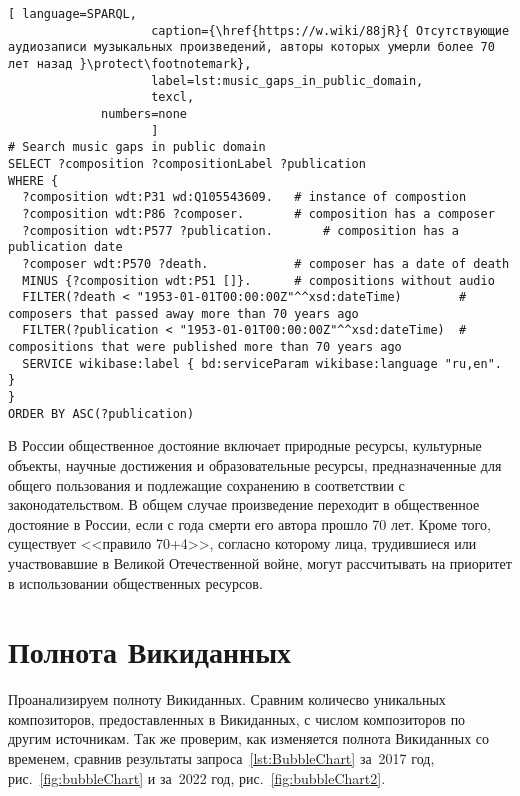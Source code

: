 \begin{lstlisting}[ language=SPARQL,
                    caption={\href{https://w.wiki/88jR}{ Отсутствующие аудиозаписи музыкальных произведений, авторы которых умерли более 70 лет назад }\protect\footnotemark},
                    label=lst:music_gaps_in_public_domain,
                    texcl,
	         numbers=none
                    ]
# Search music gaps in public domain
SELECT ?composition ?compositionLabel ?publication
WHERE {
  ?composition wdt:P31 wd:Q105543609.	# instance of compostion
  ?composition wdt:P86 ?composer.		# composition has a composer
  ?composition wdt:P577 ?publication.		# composition has a publication date
  ?composer wdt:P570 ?death.			# composer has a date of death
  MINUS {?composition wdt:P51 []}.		# compositions without audio 
  FILTER(?death < "1953-01-01T00:00:00Z"^^xsd:dateTime)        # composers that passed away more than 70 years ago
  FILTER(?publication < "1953-01-01T00:00:00Z"^^xsd:dateTime)  # compositions that were published more than 70 years ago
  SERVICE wikibase:label { bd:serviceParam wikibase:language "ru,en". }
}
ORDER BY ASC(?publication)
\end{lstlisting}%

В России общественное достояние включает природные ресурсы, культурные объекты, научные достижения и образовательные ресурсы, предназначенные для общего пользования и подлежащие сохранению в соответствии с законодательством. В общем случае произведение переходит в общественное достояние в России, если с года смерти его автора прошло 70 лет. Кроме того, существует <<правило 70+4>>, согласно которому лица, трудившиеся или участвовавшие в Великой Отечественной войне, могут рассчитывать на приоритет в использовании общественных ресурсов.

\section{Полнота Викиданных}
Проанализируем полноту Викиданных. Сравним количесво уникальных композиторов, предоставленных в Викиданных, с числом композиторов по другим источникам. Так же проверим, как изменяется полнота Викиданных со временем, сравнив результаты запроса~\ref{lst:BubbleChart} за~2017 год, рис.~\ref{fig:bubbleChart} и за~2022 год, рис.~\ref{fig:bubbleChart2}.

